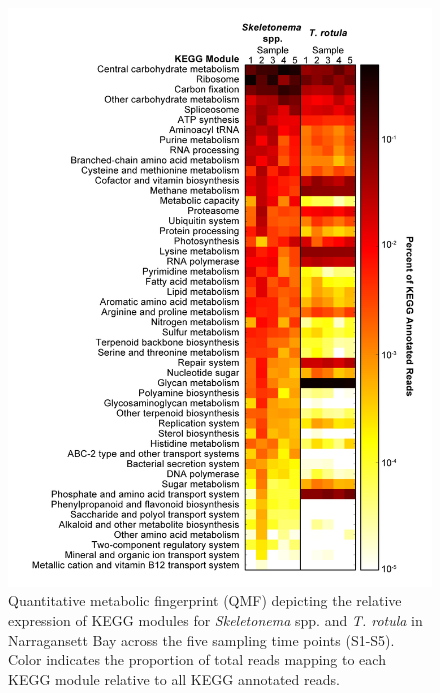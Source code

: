\begin{figure}[p!]
  \centering
    \includegraphics[width=1\textwidth]{Images/C3_Figure2_Heatmap_Hot.png}
    \caption[Quantitative metabolic fingerprint across Narragansett Bay \textit{in situ} samples]{Quantitative metabolic fingerprint (QMF) depicting the relative expression of KEGG modules for \textit{Skeletonema} spp. and \textit{T. rotula} in Narragansett Bay across the five sampling time points (S1-S5). Color indicates the proportion of total reads mapping to each KEGG module relative to all KEGG annotated reads.}
  \label{fig:c3f2}
\end{figure}

